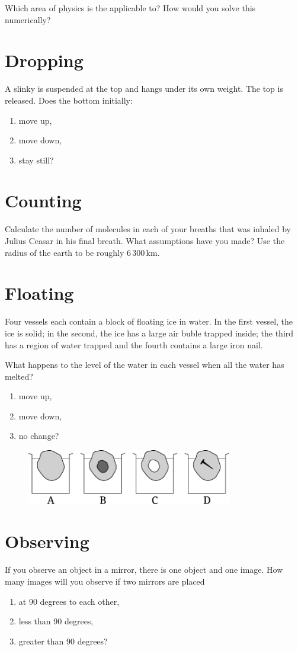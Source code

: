 Which area of physics is the applicable to? How would you solve this numerically?

\section{Dropping}
A slinky is suspended at the top and hangs under its own weight. The top is released. Does the bottom initially:
\begin{enumerate}[label=\alph*)]
	\item move up,
	\item move down,
	\item stay still?
\end{enumerate}

\section{Counting}
Calculate the number of molecules in each of your breaths that was inhaled by Julius Ceasar in his final breath. What assumptions have you made? Use the radius of the earth to be roughly 6\,300\,km.

\section{Floating}
Four vessels each contain a block of floating ice in water. In the first vessel, the ice is solid; in the second, the ice has a large air buble trapped inside; the third has a region of water trapped and the fourth contains a large iron nail.

What happens to the level of the water in each vessel when all the water has melted?
\begin{enumerate}[label=\alph*)]
	\item move up,
	\item move down,
	\item no change?
\end{enumerate}
\begin{figure}[ht]
  \centering
  \includegraphics[width=0.8\textwidth]{vessels.pdf}
\end{figure}

\section{Observing}
If you observe an object in a mirror, there is one object and one image. How many images will you observe if two mirrors are placed 
\begin{enumerate}[label=\alph*)]
	\item at 90 degrees to each other,
	\item less than 90 degrees,
	\item greater than 90 degrees?
\end{enumerate}
